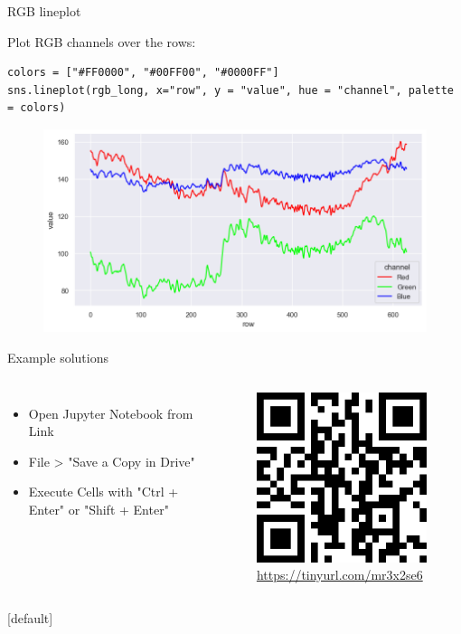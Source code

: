\documentclass[compress%
,aspectratio=169%
]{beamer}
\begin{document}
\begin{frame}[fragile]{RGB lineplot}

Plot RGB channels over the rows:
\begin{lstlisting}
colors = ["#FF0000", "#00FF00", "#0000FF"]
sns.lineplot(rgb_long, x="row", y = "value", hue = "channel", palette = colors)
\end{lstlisting}
\begin{figure}
    \centering
    \includegraphics[width = 0.6\linewidth]{mpimgbeamertheme/img/rgb_lines.png}
\end{figure}
\end{frame}



\begin{frame}{Example solutions}
\begin{columns}
    \begin{itemize}
    \item Open Jupyter Notebook from Link
    \item File > "Save a Copy in Drive"
    \item Execute Cells with "Ctrl + Enter" or "Shift + Enter"
\end{itemize}
    \begin{figure}
    \centering
    \includegraphics[width = 0.7\linewidth]{mpimgbeamertheme/img/example_qr.png}
    \caption{\alert{\url{https://tinyurl.com/mr3x2se6}}}
\end{figure}
\end{columns}

\end{frame}
[default]
\end{document}
